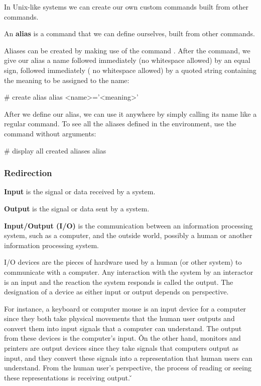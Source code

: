 In Unix-like systems we can create our own custom commands built from other commands.

\bd[Alias]
An \textbf{alias} is a command that we can define ourselves, built from other commands.
\ed

Aliases can be created by making use of the command . After the command, we give our alias a name followed immediately (no whitespace allowed) by an equal sign, followed immediately (
no whitespace allowed) by a quoted string containing the meaning to be assigned to the name:
\begin{bash}
# create alias
alias <name>='<meaning>'
\end{bash}

After we define our alias, we can use it anywhere by simply calling its name like a regular command. To see all the
aliases defined in the environment, use the  command without arguments:
\begin{bash}
# display all created aliases
alias
\end{bash}

\subsubsection{Redirection}

\bd[Input]
\textbf{Input} is the signal or data received by a system.
\ed

\bd[Output]
\textbf{Output} is the signal or data sent by a system.
\ed

\textbf{Input/Output (I/O)} is the communication between an information processing system, such as a computer, and
the outside world, possibly a human or another information processing system.
\ed

I/O devices are the pieces of hardware used by a human (or other system) to communicate with a computer. Any
interaction with the system by an interactor is an input and the reaction the system responds is called the output.
The designation of a device as either input or output depends on perspective.

\be
For instance, a keyboard or computer mouse is an input device for a computer since they both take physical
movements that the human user outputs and convert them into input signals that a computer can understand. The output
from these devices is the computer's input. \v

On the other hand, monitors and printers are output devices since they take signals that computers output as input,
and they convert these signals into a representation that human users can understand. From the human user's perspective,
the process of reading or seeing these representations is receiving output. \v

